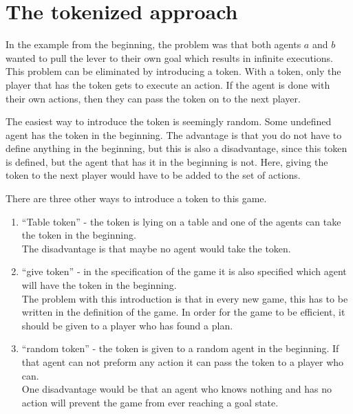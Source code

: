 \chapter{The tokenized approach}\label{chap:approach}

In the example from the beginning, the problem was that both agents $a$ and $b$ wanted to pull the lever to their own goal which results in infinite executions. This problem can be eliminated by introducing a token. With a token, only the player that has the token gets to execute an action. If the agent is done with their own actions, then they can pass the token on to the next player.

The easiest way to introduce the token is seemingly random. Some undefined agent has the token in the beginning. The advantage is that you do not have to define anything in the beginning, but this is also a disadvantage, since this token is defined, but the agent that has it in the beginning is not. Here, giving the token to the next player would have to be added to the set of actions.

There are three other ways to introduce a token to this game. 
\begin{enumerate}
  \item ``Table token'' - the token is lying on a table and one of the agents can take the token in the beginning. \\
  The disadvantage is that maybe no agent would take the token.
  \item ``give token'' - in the specification of the game it is also specified which agent will have the token in the beginning. \\
  The problem with this introduction is that in every new game, this has to be written in the definition of the game. In order for the game to be efficient, it should be given to a player who has found a plan.
  \item ``random token'' - the token is given to a random agent in the beginning. If that agent can not preform any action it can pass the token to a player who can. \\
  One disadvantage would be that an agent who knows nothing and has no action will prevent the game from ever reaching a goal state.
\end{enumerate}



